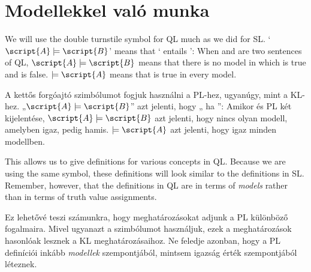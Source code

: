 \section{Modellekkel való munka}
\label{sec.UsingModels}


We will use the double turnstile symbol for QL much as we did for SL. `$\script{A}\models\script{B}$' means that ` entails ': When  and  are two sentences of QL, $\script{A}\models\script{B}$ means that there is no model in which  is true and  is false. $\models\script{A}$ means that  is true in every model.

A kettős forgóajtó szimbólumot fogjuk használni a PL-hez, ugyanúgy, mint a KL-hez. „$\script{A}\models\script{B}$” azt jelenti, hogy „ ha ”: Amikor  és  PL két kijelentése, $\script{A}\models\script{B}$  azt jelenti, hogy nincs olyan modell, amelyben  igaz,  pedig hamis. $\models\script{A}$ azt jelenti, hogy   igaz minden modellben.

This allows us to give definitions for various concepts in QL. Because we are using the same symbol, these definitions will look similar to the definitions in SL. Remember, however, that the definitions in QL are in terms of \emph{models} rather than in terms of truth value assignments.

Ez lehetővé teszi számunkra, hogy meghatározásokat adjunk a PL különböző fogalmaira. Mivel ugyanazt a szimbólumot használjuk, ezek a meghatározások hasonlóak lesznek a KL meghatározásaihoz. Ne feledje azonban, hogy a PL definíciói inkább \emph{modellek} szempontjából, mintsem igazság érték szempontjából léteznek. 

